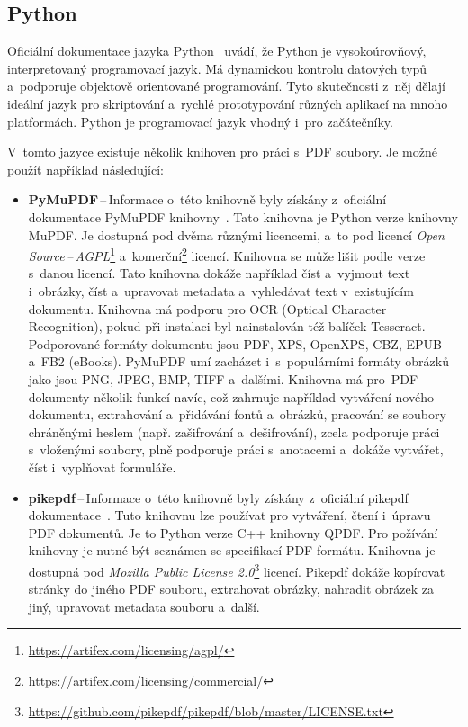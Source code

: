 \subsection*{Python} \label{python_libraries}

Oficiální dokumentace jazyka Python~\cite{Python} uvádí, že Python je 
vysokoúrovňový, interpretovaný programovací jazyk. Má dynamickou
kontrolu datových typů a~podporuje objektově orientované programování. Tyto
skutečnosti z~něj dělají ideální jazyk pro skriptování a~rychlé prototypování
různých aplikací na mnoho platformách. Python je programovací jazyk vhodný i~pro
začátečníky.

V~tomto jazyce existuje několik knihoven pro práci s~PDF soubory. Je možné použít
například následující: 
\begin{itemize}
    \item \textbf{PyMuPDF}\,--\,Informace o~této knihovně byly získány
    z~oficiální dokumentace PyMuPDF kni\-hov\-ny~\cite{PyMuPDF}.
    Tato knihovna je Python verze knihovny MuPDF. Je dostupná pod dvěma různými licencemi, a~to pod
    licencí \emph{Open Source\,--\,AGPL}\footnote{
    \href{https://artifex.com/licensing/agpl/}{https://artifex.com/licensing/agpl/}
    } a~komerční\footnote{
    \href{https://artifex.com/licensing/commercial/}{https://artifex.com/licensing/commercial/}
    } licencí. Knihovna se může lišit podle verze s~danou licencí. Tato knihovna
    dokáže například číst a~vyjmout text i~obrázky, číst a~upravovat
    metadata a~vyhledávat text v~existujícím dokumentu.
    Knihovna má podporu pro OCR (Optical Character Recognition), pokud při
    instalaci byl nainstalován též balíček Tesseract. Podporované formáty dokumentu jsou
    PDF, XPS, OpenXPS, CBZ, EPUB a~FB2 (eBooks). PyMuPDF umí zacházet
    i~s~populárními formáty obrázků jako jsou PNG, JPEG, BMP, TIFF a~dalšími.
    Knihovna má pro~PDF dokumenty několik funkcí navíc,
    což zahrnuje například vytváření nového dokumentu, extrahování a~přidávání
    fontů a~obrázků, pracování se soubory chráněnými heslem (např. zašifrování 
    a~dešifrování), zcela podporuje práci s~vloženými soubory, plně podporuje 
    práci s~anotacemi a~dokáže vytvářet, číst i~vyplňovat formuláře.

    \item \textbf{pikepdf}\,--\,Informace o~této knihovně byly získány
    z~oficiální pikepdf dokumentace~\cite{pikepdf}.
    Tuto knihovnu lze používat pro vytváření, čtení i~úpravu PDF dokumentů.
    Je to Python verze C++ knihovny QPDF. Pro požívání knihovny je nutné být
    seznámen se specifikací PDF formátu. Knihovna je dostupná pod
    \emph{Mozilla Public License 2.0}\footnote{
    \href{https://github.com/pikepdf/pikepdf/blob/master/LICENSE.txt}{https://github.com/pikepdf/pikepdf/blob/master/LICENSE.txt}
    } licencí. Pikepdf dokáže kopírovat stránky do jiného PDF souboru, extrahovat
    obrázky, nahradit obrázek za jiný, upravovat metadata souboru a~další.

\end{itemize}


